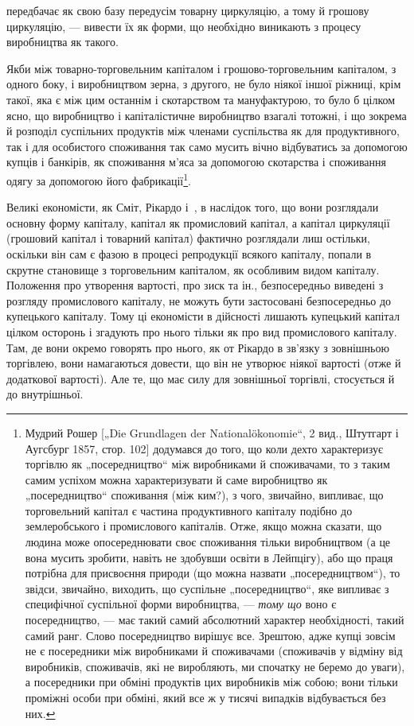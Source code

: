 \parcont{}  %
передбачає як свою базу передусім товарну циркуляцію, а тому
й грошову циркуляцію, — вивести їх як форми, що необхідно
виникають з процесу виробництва як такого.

Якби між товарно-торговельним капіталом і грошово-торговельним
капіталом, з одного боку, і виробництвом зерна, з
другого, не було ніякої іншої ріжниці, крім такої, яка є між цим
останнім і скотарством та мануфактурою, то було б цілком
ясно, що виробництво і капіталістичне виробництво взагалі
тотожні, і що зокрема й розподіл суспільних продуктів між членами
суспільства як для продуктивного, так і для особистого
споживання так само мусить вічно відбуватись за допомогою
купців і банкірів, як споживання м’яса за допомогою скотарства
і споживання одягу за допомогою його фабрикації\footnote{
Мудрий Рошер [„Die Grundlagen der Nationalökonomie“, 2 вид., Штутгарт
і Аугсбург 1857, стор. 102] додумався до того, що коли дехто характеризує
торгівлю як „посередництво“ між виробниками й споживачами, то з таким самим
успіхом можна характеризувати й саме виробництво як „посередництво“
споживання (між ким?), з чого, звичайно, випливає, що торговельний капітал
є частина продуктивного капіталу подібно до землеробського і промислового
капіталів. Отже, якщо можна сказати, що людина може опосереднювати своє
споживання тільки виробництвом (а це вона мусить зробити, навіть не здобувши
освіти в Лейпцігу), або що праця потрібна для присвоєння природи (що можна
назвати „посередництвом“), то звідси, звичайно, виходить, що суспільне „посередництво“, яке випливає
з специфічної суспільної форми виробництва, — \emph{тому
що} воно є посередництво, — має такий самий абсолютний характер необхідності,
такий самий ранг. Слово посередництво вирішує все. Зрештою, адже купці зовсім
не є посередники між виробниками й споживачами (споживачів у відміну від виробників, споживачів, які
не виробляють, ми спочатку не беремо до уваги), а посередники при обміні продуктів цих виробників
між собою; вони тільки проміжні
особи при обміні, який все ж у тисячі випадків відбувається без них.
}.

Великі економісти, як Сміт, Рікардо і~, в наслідок того,
що вони розглядали основну форму капіталу, капітал як промисловий
капітал, а капітал циркуляції (грошовий капітал і товарний
капітал) фактично розглядали лиш остільки, оскільки він
сам є фазою в процесі репродукції всякого капіталу, попали в
скрутне становище з торговельним капіталом, як особливим видом
капіталу. Положення про утворення вартості, про зиск та
ін., безпосередньо виведені з розгляду промислового капіталу,
не можуть бути застосовані безпосередньо до купецького капіталу.
Тому ці економісти в дійсності лишають купецький капітал
цілком осторонь і згадують про нього тільки як про вид
промислового капіталу. Там, де вони окремо говорять про
нього, як от Рікардо в зв’язку з зовнішньою торгівлею, вони
намагаються довести, що він не утворює ніякої вартості (отже
й додаткової вартості). Але те, що має силу для зовнішньої
торгівлі, стосується й до внутрішньої.

